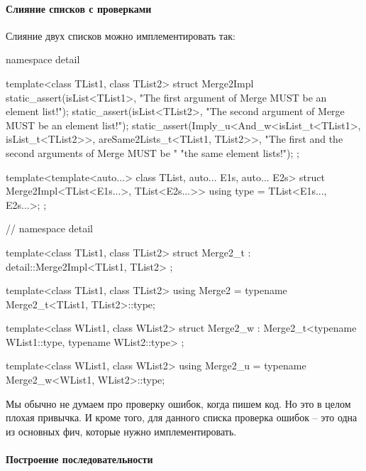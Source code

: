 \paragraph{Слияние списков с проверками}

Слияние двух списков можно имплементировать так:
\begin{cppcode}
namespace detail {
template<class TList1, class TList2>
struct Merge2Impl {
  static_assert(isList<TList1>,
                "The first argument of Merge MUST be an element list!");
  static_assert(isList<TList2>,
                "The second argument of Merge MUST be an element list!");
  static_assert(Imply_u<And_w<isList_t<TList1>, isList_t<TList2>>,
                        areSame2Lists_t<TList1, TList2>>,
                "The first and the second arguments of Merge MUST be "
                "the same element lists!");
};

template<template<auto...> class TList, auto... E1s, auto... E2s>
struct Merge2Impl<TList<E1s...>, TList<E2s...>> {
  using type = TList<E1s..., E2s...>;
};
} // namespace detail

template<class TList1, class TList2>
struct Merge2_t : detail::Merge2Impl<TList1, TList2> {};

template<class TList1, class TList2>
using Merge2 = typename Merge2_t<TList1, TList2>::type;

template<class WList1, class WList2>
struct Merge2_w : Merge2_t<typename WList1::type, typename WList2::type> {};

template<class WList1, class WList2>
using Merge2_u = typename Merge2_w<WList1, WList2>::type;
\end{cppcode}
Мы обычно не думаем про проверку ошибок, когда пишем код.
Но это в целом плохая привычка.
И кроме того, для данного списка проверка ошибок -- это одна из основных фич, которые нужно имплементировать.

\paragraph{Построение последовательности}


